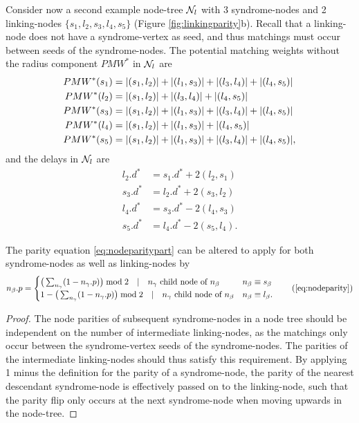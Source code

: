 Consider now a second example node-tree $\mathcal{N}_l$ with 3 syndrome-nodes and 2 linking-nodes $\{s_1, l_2, s_3, l_4, s_5\}$ (Figure \ref{fig:linkingparity}b). Recall that a linking-node does not have a syndrome-vertex as seed, and thus matchings must occur between seeds of the syndrome-nodes. The potential matching weights without the radius component $PMW^*$ in $\mathcal{N}_l$ are
\begin{align*}
  PMW^*(s_1) &= \abs{(s_1, l_2)} + \abs{(l_1, s_3)} + \abs{(l_3, l_4)} + \abs{(l_4, s_5)} \\
  PMW^*(l_2) &= \abs{(s_1, l_2)} + \abs{(l_3, l_4)} + \abs{(l_4, s_5)} \\
  PMW^*(s_3) &= \abs{(s_1, l_2)} + \abs{(l_1, s_3)} + \abs{(l_3, l_4)} + \abs{(l_4, s_5)} \\
  PMW^*(l_4) &= \abs{(s_1, l_2)} + \abs{(l_1, s_3)} + \abs{(l_4, s_5)} \\
  PMW^*(s_5) &= \abs{(s_1, l_2)} + \abs{(l_1, s_3)} + \abs{(l_3, l_4)} + \abs{(l_4, s_5)},
\end{align*}
and the delays in $\mathcal{N}_l$ are 
\begin{align*}
  l_2.d^* &= s_1.d^* + 2(l_2, s_1)\\
  s_3.d^* &= l_2.d^* + 2(s_3, l_2)\\
  l_4.d^* &= s_3.d^* - 2(l_4, s_3)\\
  s_5.d^* &= l_4.d^* - 2(s_5, l_4).
\end{align*}

\begin{lemma}\label{lem:nodeparity}
  The parity equation \eqref{eq:nodeparitypart} can be altered to apply for both syndrome-nodes as well as linking-nodes by   
  \begin{equation}
    n_\beta.p =
    \begin{cases}
      \big( \sum_{n_\gamma} (1-n_\gamma.p) \big ) \bmod 2 \hspace{1em} | \hspace{1em} n_\gamma \text{ child node of } n_\beta & n_\beta \equiv s_\beta \\
      1 - \big( \sum_{n_\gamma} (1-n_\gamma.p) \big ) \bmod 2 \hspace{1em} | \hspace{1em} n_\gamma \text{ child node of } n_\beta & n_\beta \equiv l_\beta.
    \end{cases}\tag{\ref{eq:nodeparity}}
  \end{equation}
\end{lemma}
\begin{proof}
  The node parities of subsequent syndrome-nodes in a node tree should be independent on the number of intermediate linking-nodes, as the matchings only occur between the syndrome-vertex seeds of the syndrome-nodes. The parities of the intermediate linking-nodes should thus satisfy this requirement. By applying 1 minus the definition for the parity of a syndrome-node, the parity of the nearest descendant syndrome-node is effectively passed on to the linking-node, such that the parity flip only occurs at the next syndrome-node when moving upwards in the node-tree. 
\end{proof}

